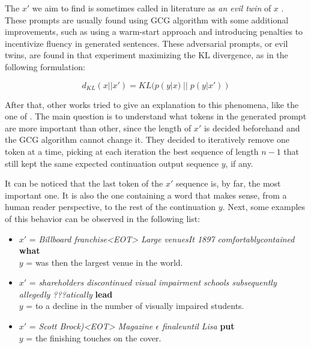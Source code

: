 \documentclass[../thesis]{subfiles}
\begin{document}
The $x'$ we aim to find is sometimes called in literature as \emph{an evil twin} of $x$ \cite{promptshaveeviltwins}. These prompts are usually found using GCG algorithm with some additional improvements, such as using a warm-start approach and introducing penalties to incentivize fluency in generated sentences.
These adversarial prompts, or evil twins, are found in that experiment maximizing the KL divergence, as in the following formulation:

\begin{equation}
    d_{KL}(x || x') = KL( p(y|x) \; || \; p(y|x'))
    \label{eq:kl_prompts}
\end{equation}

After that, other works tried to give an explanation to this phenomena, like the one of \citeauthor{eviltwinsarenotthatevil}.
The main question is to understand what tokens in the generated prompt are more important than other, since the length of $x'$ is decided beforehand and the GCG algorithm cannot change it.
They decided to iteratively remove one token at a time, picking at each iteration the best sequence of length $n-1$ that still kept the same expected continuation output sequence $y$, if any.

It can be noticed that the last token of the $x'$ sequence is, by far, the most important one. It is also the one containing a word that makes sense, from a human reader perspective, to the rest of the continuation $y$. Next, some examples of this behavior can be observed in the following list:
\begin{itemize}
    \item $x'$ = \emph{Billboard franchise<EOT> Large venuesIt 1897 comfortablycontained} \textbf{what} \\
        $y$ = was then the largest venue in the world.
    \item $x'$ = \emph{shareholders discontinued visual impairment schools subsequently allegedly ???atically} \textbf{lead} \\
        $y$ = to a decline in the number of visually impaired students.
    \item $x'$ = \emph{Scott Brock)<EOT> Magazine $\epsilon$ finaleuntil Lisa} \textbf{put} \\
    $y$ = the finishing touches on the cover.
\end{itemize}
\end{document}
